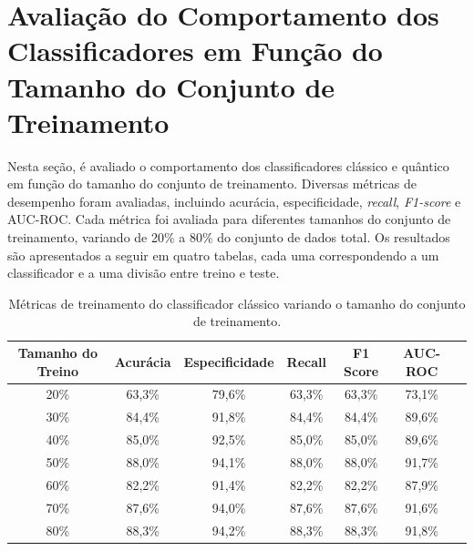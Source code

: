 \section{Avaliação do Comportamento dos Classificadores em Função do Tamanho do Conjunto de Treinamento}

Nesta seção, é avaliado o comportamento dos classificadores clássico e quântico em função do tamanho do conjunto de treinamento. Diversas métricas de desempenho foram avaliadas, incluindo acurácia, especificidade, \textit{recall}, \textit{F1-score} e AUC-ROC. Cada métrica foi avaliada para diferentes tamanhos do conjunto de treinamento, variando de 20\% a 80\% do conjunto de dados total. Os resultados são apresentados a seguir em quatro tabelas, cada uma correspondendo a um classificador e a uma divisão entre treino e teste.

\begin{table}[H]
\centering
\caption{Métricas de treinamento do classificador clássico variando o tamanho do conjunto de treinamento.}
\begin{tabular}{|c|c|c|c|c|c|c|}
\hline
\textbf{Tamanho do Treino} & \textbf{Acurácia} & \textbf{Especificidade} & \textbf{Recall} & \textbf{F1 Score} & \textbf{AUC-ROC} \\ \hline
20\% & 63,3\% & 79,6\% & 63,3\% & 63,3\% & 73,1\% \\ \hline
30\% & 84,4\% & 91,8\% & 84,4\% & 84,4\% & 89,6\% \\ \hline
40\% & 85,0\% & 92,5\% & 85,0\% & 85,0\% & 89,6\% \\ \hline
50\% & 88,0\% & 94,1\% & 88,0\% & 88,0\% & 91,7\% \\ \hline
60\% & 82,2\% & 91,4\% & 82,2\% & 82,2\% & 87,9\% \\ \hline
70\% & 87,6\% & 94,0\% & 87,6\% & 87,6\% & 91,6\% \\ \hline
80\% & 88,3\% & 94,2\% & 88,3\% & 88,3\% & 91,8\% \\ \hline
\end{tabular}
\end{table}

